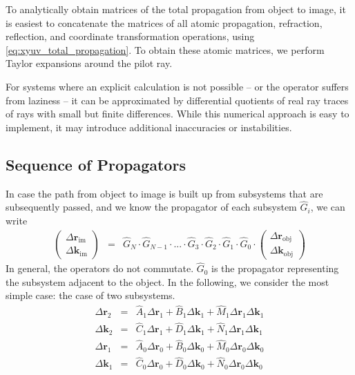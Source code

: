 \documentclass[12pt,a4paper,twoside,openright,BCOR10mm,headsepline,titlepage,abstracton,chapterprefix,final]{scrreprt}
\newcommand\Vector[1]{{\mathbf{#1}}}
\newcommand\wavenumber{k}
\newcommand\Wavevector{\Vector{\wavenumber}}
\newcommand\im{\textrm{im}}
\newcommand\obj{\textrm{obj}}
\begin{document}
To analytically obtain matrices of the total propagation from object to image, 
it is easiest to concatenate the matrices of all atomic propagation, refraction, reflection, and coordinate transformation operations,
using \eqref{eq:xyuv_total_propagation}.
To obtain these atomic matrices, we perform Taylor expansions around the pilot ray.

For systems where an explicit calculation is not possible
-- or the operator suffers from laziness --
it can be approximated by differential quotients of real ray traces of rays with small but finite differences.
While this numerical approach is easy to implement, it may introduce additional inaccuracies or instabilities.

\subsection{Sequence of Propagators}
In case the path from object to image is built up from subsystems that are subsequently passed, 
and we know the propagator of each subsystem $\hat{G}_i$,
we can write
\begin{eqnarray}
 \begin{pmatrix}
  \Delta \Vector{r}_\im \\ \Delta \Wavevector_\im
 \end{pmatrix}
 &=&
 \hat{G}_N \cdot \hat{G}_{N-1} \cdot ... \cdot \hat{G}_3 \cdot \hat{G}_2 \cdot \hat{G}_1 \cdot \hat{G}_0 \cdot
 \begin{pmatrix}
  \Delta \Vector{r}_\obj \\ \Delta \Wavevector_\obj
 \end{pmatrix}
\end{eqnarray}
In general, the operators do not commutate. $\hat{G}_0$ is the propagator representing the subsystem adjacent to the object.
In the following, we consider the most simple case: the case of two subsystems.
\begin{eqnarray}
 \Delta \Vector{r}_2  &=& \hat{A}_1 \Delta \Vector{r}_1 + \hat{B}_1 \Delta \Vector{k}_1 + \hat{M}_1 \Delta \Vector{r}_1 \Delta \Vector{k}_1 \\ 
 \Delta \Wavevector_2 &=& \hat{C}_1 \Delta \Vector{r}_1 + \hat{D}_1 \Delta \Vector{k}_1 + \hat{N}_1 \Delta \Vector{r}_1 \Delta \Vector{k}_1 \\
 \Delta \Vector{r}_1  &=& \hat{A}_0 \Delta \Vector{r}_0 + \hat{B}_0 \Delta \Vector{k}_0 + \hat{M}_0 \Delta \Vector{r}_0 \Delta \Vector{k}_0 \\ 
 \Delta \Wavevector_1 &=& \hat{C}_0 \Delta \Vector{r}_0 + \hat{D}_0 \Delta \Vector{k}_0 + \hat{N}_0 \Delta \Vector{r}_0 \Delta \Vector{k}_0
\end{eqnarray}
\end{document}
